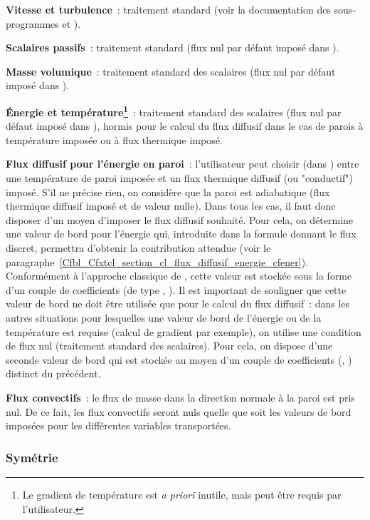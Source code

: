 {\bf Vitesse et turbulence}~: traitement standard (voir la documentation des
sous-programmes 
et ).

{\bf Scalaires passifs}~: traitement standard
(flux nul par défaut imposé dans ).

{\bf Masse volumique}~: traitement standard des scalaires
(flux nul par défaut imposé dans ).

{\bf Énergie et température\footnote{Le gradient de température est
{\it a priori} inutile, mais peut être requis par l'utilisateur.}}~:
traitement standard des scalaires
(flux nul par défaut imposé dans ), hormis pour le
calcul du flux diffusif dans le cas de parois à température imposée
ou à flux thermique imposé.

{\bf Flux diffusif pour l'énergie en paroi}~:
l'utilisateur peut choisir (dans ) entre une température de paroi imposée
et un flux thermique diffusif (ou "conductif") imposé.
S'il ne précise rien, on considère que la paroi est adiabatique
(flux thermique diffusif imposé et de valeur nulle).
Dans tous les cas, il faut donc disposer d'un moyen d'imposer le flux diffusif
souhaité. Pour cela, on détermine une valeur de bord pour l'énergie
qui, introduite dans la formule donnant le flux discret, permettra
d'obtenir la contribution attendue
(voir le paragraphe~\ref{Cfbl_Cfxtcl_section_cl_flux_diffusif_energie_cfener}).
Conformément à l'approche classique de \CS, cette valeur est
stockée sous la forme d'un couple de coefficients
(de type , ).
Il est important de souligner que cette valeur de bord
ne doit être utilisée que pour le calcul
du flux diffusif~: dans les autres situations pour lesquelles
une valeur de bord de l'énergie ou de la température est requise
(calcul de gradient par exemple), on utilise une condition de flux nul
(traitement standard des scalaires). Pour cela, on dispose d'une
seconde valeur de bord qui est stockée au moyen d'un
couple de coefficients (, ) distinct du précédent.

{\bf Flux convectifs}~: le flux de masse dans la direction normale à la paroi est
pris nul. De ce fait, les flux convectifs seront nuls quelle que soit les valeurs
de bord imposées pour les différentes variables transportées.

\subsubsection*{Symétrie}

